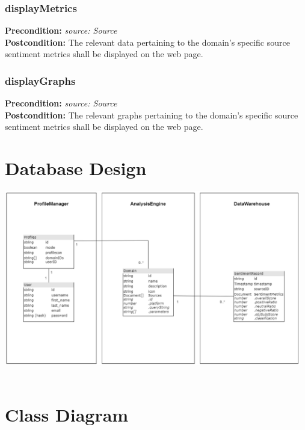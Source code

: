 \documentclass[12pt]{article}
\begin{document}
\subsubsection*{displayMetrics}
\textbf{Precondition:} \textit{source: Source} \\
\textbf{Postcondition:} The relevant data pertaining to the domain's specific source sentiment metrics shall be displayed on the web page.

\subsubsection*{displayGraphs}
\textbf{Precondition:} \textit{source: Source} \\
\textbf{Postcondition:} The relevant graphs pertaining to the domain's specific source sentiment metrics shall be displayed on the web page.


\newpage

\section{Database Design}

\includegraphics[width=13cm]{../../Images/databaseDesignPic.png}\\\\  

\newpage

\section{Class Diagram}
\end{document}
